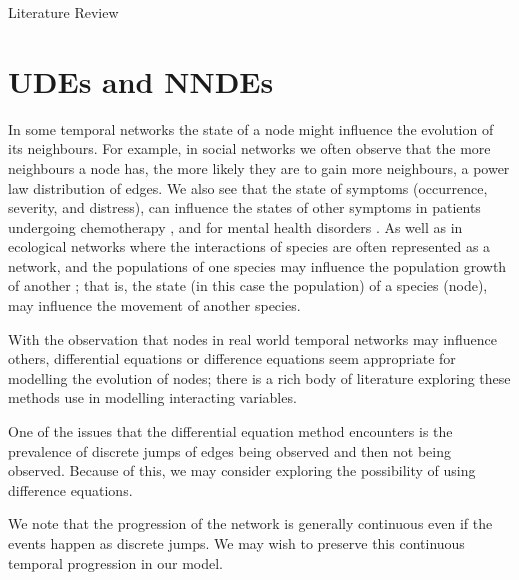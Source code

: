 \documentclass[12pt]{amsbook}
\begin{document}
\begin{chapter}{Literature Review}
    \section{UDEs and NNDEs}
        In some temporal networks the state of a node might influence the evolution of its neighbours. For example, in social networks we often observe that the more neighbours a node has, the more likely they are to gain more neighbours, a power law distribution of edges\cite{zhao2012multi,garg2009evolution}. We also see that the state of symptoms (occurrence, severity, and distress), can influence the states of other symptoms in patients undergoing chemotherapy \cite{papachristou2019network,kalantari2022network}, and for mental health disorders \cite{contreras2020temporal}. As well as in ecological networks where the interactions of species are often represented as a network, and the populations of one species may influence the population growth of another \cite{elton2001animal,volterra1927variazioni}; that is, the state (in this case the population) of a species (node), may influence the movement of another species.
        
        With the observation that nodes in real world temporal networks may influence others, differential equations or difference equations seem appropriate for modelling the evolution of nodes; there is a rich body of literature exploring these methods use in modelling interacting variables. 
        
        One of the issues that the differential equation method encounters is the prevalence of discrete jumps of edges being observed and then not being observed. Because of this, we may consider exploring the possibility of using difference equations.  
    
        We note that the progression of the network is generally continuous even if the events happen as discrete jumps. We may wish to preserve this continuous temporal progression in our model.
        

        

\end{chapter}
\end{document}

